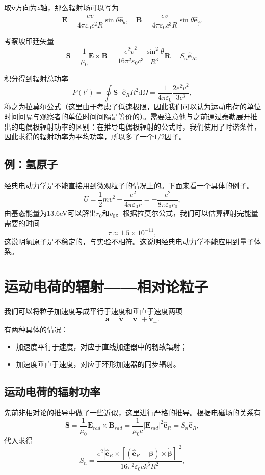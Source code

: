 \documentclass[UTF8]{ctexbook}
\renewcommand{\d}{\mathrm{d}}
\renewcommand{\b}{\boldsymbol}
\numberwithin{equation}{chapter}
\begin{document}
	取$\dot{\b{v}}$方向为$z$轴，那么辐射场可以写为
	\[\b{E}=\frac{e\dot{v}}{4\pi\varepsilon_0c^2 R}\sin\theta\hat{\b{e}}_\theta,\quad \b{B}=\frac{e\dot{v}}{4\pi\varepsilon_0c^3 R}\sin\theta\hat{\b{e}}_{\phi}.\]
	
	考察坡印廷矢量
	\[\b{S}=\frac{1}{\mu_0}\b{E}\times\b{B}=\frac{e^2\dot{v}^2}{16\pi^2 \varepsilon_0 c^3}\frac{\sin^2\theta}{R^3}\b{R}=S_n\hat{\b{e}}_R,\]
	
	积分得到辐射总功率
	\[P(t')=\oint \b{S}\cdot\hat{\b{e}}_R R^2\d \Omega=\frac{1}{4\pi\varepsilon_0}\frac{2e^2\dot{v}^2}{3c^3},\]
	称之为拉莫尔公式（这里由于考虑了低速极限，因此我们可以认为运动电荷的单位时间间隔与观察者的单位时间间隔是等价的）。需要注意他与之前通过泰勒展开推出的电偶极辐射功率的区别：在推导电偶极辐射的公式时，我们使用了时谐条件，因此求得的辐射功率为平均功率，所以多了一个$1/2$因子。
	
	\subsection{例：氢原子}
	经典电动力学是不能直接用到微观粒子的情况上的。下面来看一个具体的例子。
	\[U=\frac{1}{2}mv^2-\frac{e^2}{4\pi\varepsilon_0 r}=-\frac{e^2}{8\pi\varepsilon_0 r_0},\]
	由基态能量为13.6eV可以解出$r_0$和$v_0$。根据拉莫尔公式，我们可以估算辐射完能量需要的时间
	\[\tau\approx 1.5\times 10^{-11},\]
	这说明氢原子是不稳定的，与实验不相符。这说明经典电动力学不能应用到量子体系。
	
	
	\section{运动电荷的辐射——相对论粒子}
	
	我们可以将粒子加速度写成平行于速度和垂直于速度两项
	\[\b{a}=\dot{\b{v}}=\dot{\b{v}}_\parallel+\dot{\b{v}}_\perp.\]
	有两种具体的情况：
	\begin{itemize}
		\item 加速度平行于速度，对应于直线加速器中的轫致辐射；
		
		\item 加速度垂直于速度，对应于环形加速器的同步辐射。
	\end{itemize}
	
	\subsection{运动电荷的辐射功率}
	
	先前非相对论的推导中做了一些近似，这里进行严格的推导。根据电磁场的关系有
	\[\b{S}=\frac{1}{\mu_0}\b{E}_{rad}\times\b{B}_{rad}=\frac{1}{\mu_0 c}|\b{E}_{rad}|^2\hat{\b{e}}_R=S_n\hat{\b{e}}_R,\]
	代入求得
	\[S_n=\frac{e^2|\hat{\b{e}}_R\times[(\hat{\b{e}}_R-\b{\beta})\times\dot{\b{\beta}}]|^2}{16\pi^2\varepsilon_0 c k^6 R^2},\]
	
\end{document}
